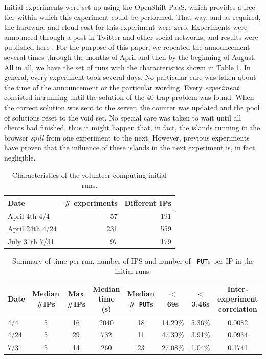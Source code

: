 \documentclass[journal,onecolumn]{IEEEtran}
\begin{document}
Initial experiments were set up using the OpenShift
PaaS, which provides a free tier within which this %
experiment could be performed. That way, and as required, the hardware
and cloud cost for this experiment were zero. Experiments were
announced through a post in Twitter and other social networks, and
results were published here \cite{DBLP:conf/gecco/GuervosG15}. For the
purpose of this paper, we repeated the announcement several times
through the months of April and then by the beginning of August. All
in all, we have the set of runs with the characteristics shown in
Table \ref{tab:runs}. In general, every experiment took several
days. No particular care was taken about the time of the announcement
or the particular wording. Every {\em experiment} consisted in running
until the solution of the 40-trap problem was found. When the correct
solution was sent to the server, the counter was updated and the pool
of solutions reset to the void set. No special care was taken to wait
until all clients had finished, thus it might happen that, in fact,
the islands running in the browser {\em spill} from one experiment to
the next. However, previous experiments have proven that the influence
of these islands in the next experiment is, in fact negligible.
%
\begin{table}
\caption{Characteristics of the volunteer computing initial runs. \label{tab:runs}}
\begin{center}
\begin{tabular}{l|rr}
\hline
Date & \# experiments & Different IPs \\
\hline
April 4th 4/4 & 57 & 191 \\
April 24th 4/24 &  231 & 559 \\
July 31th 7/31 & 97 & 179 \\
\hline
\end{tabular}
\end{center}
\end{table}
%
\begin{table}
\caption{Summary of time per run, number of IPS and number of {\tt
    PUT}s per IP in the initial runs. \label{tab:summary:os}}
\begin{center}
\begin{tabular}{l|ccccccc}
\hline
Date & Median \#IPs & Max \#IPs & Median time (s) & Median \#{\tt
  PUT}s & $<$ 69s & $<$ 3.46s & Inter-experiment correlation\\
\hline
4/4 & 5 & 16 & 2040 & 18 & 14.29\% & 5.36\% & 0.0082 \\
4/24 &  5 & 29 & 732 & 11 & 47.39\% & 3.91\% & 0.0934\\
7/31 & 5 & 14 & 260 & 23 & 27.08\% & 1.04\%  & 0.1741\\
\hline
\end{tabular}
\end{center}
\end{table}
\end{document}
